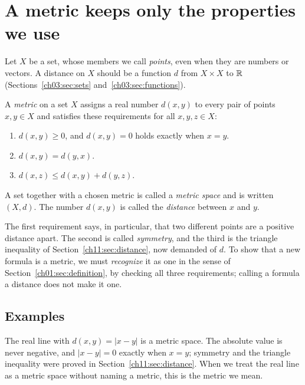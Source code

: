 \section{A metric keeps only the properties we use}\label{ch11:sec:metric}
Let $X$ be a set, whose members we call \emph{points}, even when they are numbers or vectors. A distance on $X$ should be a function $d$ from $X\times X$ to $\mathbb R$ (Sections~\ref{ch03:sec:sets} and~\ref{ch03:sec:functions}).
\par\noindent\begin{minipage}{\linewidth}
\begin{definition}[Metric]\label{def:metric}
A \emph{metric} on a set $X$ assigns a real number $d(x,y)$ to every pair of points $x,y\in X$ and satisfies these requirements for all $x,y,z\in X$:
\begin{enumerate}
\item $d(x,y)\ge0$, and $d(x,y)=0$ holds exactly when $x=y$.
\item $d(x,y)=d(y,x)$.
\item $d(x,z)\le d(x,y)+d(y,z)$.
\end{enumerate}
A set together with a chosen metric is called a \emph{metric space} and is written $(X,d)$. The number $d(x,y)$ is called the \emph{distance} between $x$ and $y$.
\end{definition}
\end{minipage}\par

The first requirement says, in particular, that two different points are a positive distance apart. The second is called \emph{symmetry}, and the third is the triangle inequality of Section~\ref{ch11:sec:distance}, now demanded of $d$. To show that a new formula is a metric, we must \emph{recognize} it as one in the sense of Section~\ref{ch01:sec:definition}, by checking all three requirements; calling a formula a distance does not make it one.


\subsection*{Examples}
The real line with $d(x,y)=|x-y|$ is a metric space. The absolute value is never negative, and $|x-y|=0$ exactly when $x=y$; symmetry and the triangle inequality were proved in Section~\ref{ch11:sec:distance}. When we treat the real line as a metric space without naming a metric, this is the metric we mean.

